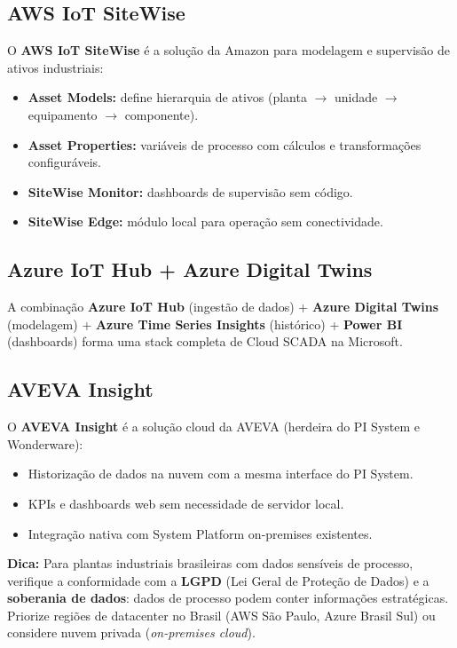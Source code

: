 \subsection{AWS IoT SiteWise}\label{aws-iot-sitewise}

O \textbf{AWS IoT SiteWise} é a solução da Amazon para modelagem e supervisão de ativos industriais:

\begin{itemize}
\tightlist
\item
  \textbf{Asset Models:} define hierarquia de ativos (planta \ensuremath{\rightarrow} unidade \ensuremath{\rightarrow} equipamento \ensuremath{\rightarrow} componente).
\item
  \textbf{Asset Properties:} variáveis de processo com cálculos e transformações configuráveis.
\item
  \textbf{SiteWise Monitor:} dashboards de supervisão sem código.
\item
  \textbf{SiteWise Edge:} módulo local para operação sem conectividade.
\end{itemize}

\subsection{Azure IoT Hub + Azure Digital Twins}\label{azure-iot-hub-azure-digital-twins}

A combinação \textbf{Azure IoT Hub} (ingestão de dados) + \textbf{Azure Digital Twins} (modelagem) + \textbf{Azure Time Series Insights} (histórico) + \textbf{Power BI} (dashboards) forma uma stack completa de Cloud SCADA na Microsoft.

\subsection{AVEVA Insight}\label{aveva-insight}

O \textbf{AVEVA Insight} é a solução cloud da AVEVA (herdeira do PI System e Wonderware):

\begin{itemize}
\tightlist
\item
  Historização de dados na nuvem com a mesma interface do PI System.
\item
  KPIs e dashboards web sem necessidade de servidor local.
\item
  Integração nativa com System Platform on-premises existentes.
\end{itemize}

\begin{caixadica}

\textbf{Dica:} Para plantas industriais brasileiras com dados sensíveis de processo, verifique a conformidade com a \textbf{LGPD} (Lei Geral de Proteção de Dados) e a \textbf{soberania de dados}: dados de processo podem conter informações estratégicas. Priorize regiões de datacenter no Brasil (AWS São Paulo, Azure Brasil Sul) ou considere nuvem privada (\emph{on-premises cloud}).

\end{caixadica}

